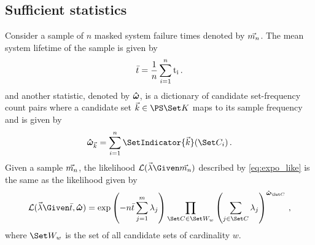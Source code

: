 \documentclass[../main.tex]{subfiles}
\begin{document}
\subsection{Sufficient statistics}
\label{sec:expo_sufficient}
Consider a sample of $n$ masked system failure times denoted by $\vec{m_n}$. The mean system lifetime of the sample is given by
\begin{equation}
    \bar{t} = \frac{1}{n} \sum_{i=1}^{n} \rm{t}_i\,.
\end{equation}
and another statistic, denoted by $\boldsymbol{\hat\omega}$, is a dictionary of candidate set-frequency count pairs where a candidate set $\vec{k} \in \cands$ maps to its sample frequency and is given by
\begin{equation}
    \cntsymb_{\vec{k}} = \sum_{i=1}^{n} \SetIndicator{\vec{k}}(\cand_i)\,.
\end{equation}
Given a sample $\vec{m_n}$, the likelihood $\likelihood(\vec\lambda \Given \mfso)$ described by \cref{eq:expo_like} is the same as the likelihood given by
\begin{equation}
\likelihood(\vec\lambda \Given \bar t, \cntsymb) =
    \exp \left( -n \bar{t} \sum_{j=1}^{m} \lambda_j \right)
    \prod_{\cand \in \candsw{w}} \left ( \sum_{j \in \cand} \lambda_j \right )^{\cntsymb_{\cand}}\,,
\end{equation}
where $\candsw{w}$ is the set of all candidate sets of cardinality $w$.
\end{document}
